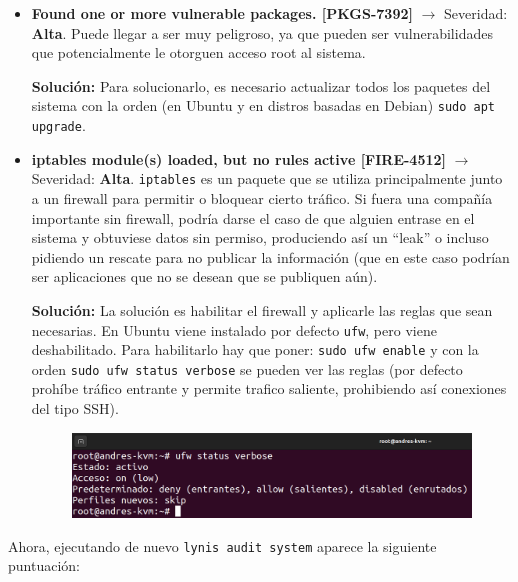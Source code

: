 \documentclass{article}
\begin{document}
\begin{itemize}
    \item \textbf{Found one or more vulnerable packages. [PKGS-7392]} $\rightarrow$ Severidad: \textbf{Alta}. Puede llegar a ser muy peligroso, ya que pueden ser vulnerabilidades que potencialmente le otorguen acceso root al sistema. 
    
    \textbf{Solución: }Para solucionarlo, es necesario actualizar todos los paquetes del sistema con la orden (en Ubuntu y en distros basadas en Debian) \verb|sudo apt upgrade|.


    \item \textbf{iptables module(s) loaded, but no rules active [FIRE-4512]} $\rightarrow$ Severidad: \textbf{Alta}. \verb|iptables| es un paquete que se utiliza principalmente junto a un firewall para permitir o bloquear cierto tráfico. Si fuera una compañía importante sin firewall, podría darse el caso de que alguien entrase en el sistema y obtuviese datos sin permiso, produciendo así un ``leak'' o incluso pidiendo un rescate para no publicar la información (que en este caso podrían ser aplicaciones que no se desean que se publiquen aún).
    
    \textbf{Solución: }La solución es habilitar el firewall y aplicarle las reglas que sean necesarias. En Ubuntu viene instalado por defecto \verb|ufw|, pero viene deshabilitado. Para habilitarlo hay que poner: \verb|sudo ufw enable| y con la orden \verb|sudo ufw status verbose| se pueden ver las reglas (por defecto prohíbe tráfico entrante y permite trafico saliente, prohibiendo así conexiones del tipo SSH).

    \begin{figure}[H]
        \includegraphics[width=\textwidth]{imagenes/ufwstatus.png}
    \end{figure}
\end{itemize}

\bigskip

Ahora, ejecutando de nuevo \verb|lynis audit system| aparece la siguiente puntuación:
\end{document}
